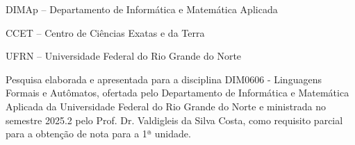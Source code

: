 
\instituicao
{
	DIMAp -- Departamento de Informática e Matemática Aplicada\par
   CCET -- Centro de Ciências Exatas e da Terra\par
   UFRN -- Universidade Federal do Rio Grande do Norte
}
	
\comentario
{
	Pesquisa elaborada e apresentada para a disciplina DIM0606 - Linguagens Formais e Autômatos, ofertada pelo Departamento de Informática e Matemática Aplicada da Universidade Federal do Rio Grande do Norte e ministrada no semestre 2025.2 pelo Prof. Dr. Valdigleis da Silva Costa, como requisito parcial para a obtenção de nota para a 1ª unidade.   %
}
		
	
\folhaderosto